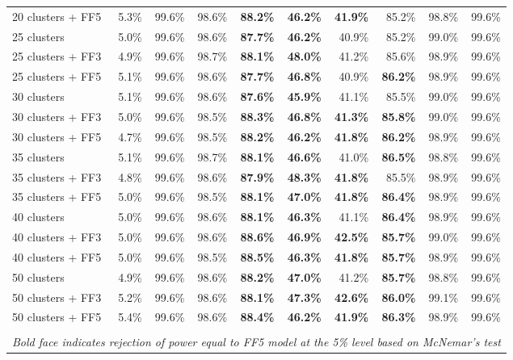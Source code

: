 \begin{table}[!h]
\begin{center}
\begin{tabular}{lrrrrrrrrr}
20 clusters + FF5	& 5.3\% & 99.6\% & 98.6\% & \textbf{88.2\%} & \textbf{46.2\%} & \textbf{41.9\%} & 85.2\% & 98.8\% & 99.6\% \\
25 clusters	& 5.0\% & 99.6\% & 98.6\% & \textbf{87.7\%} & \textbf{46.2\%} & 40.9\% & 85.2\% & 99.0\% & 99.6\% \\
25 clusters + FF3	& 4.9\% & 99.6\% & 98.7\% & \textbf{88.1\%} & \textbf{48.0\%} & 41.2\% & 85.6\% & 98.9\% & 99.6\% \\
25 clusters + FF5	& 5.1\% & 99.6\% & 98.6\% & \textbf{87.7\%} & \textbf{46.8\%} & 40.9\% & \textbf{86.2\%} & 98.9\% & 99.6\% \\
30 clusters	& 5.1\% & 99.6\% & 98.6\% & \textbf{87.6\%} & \textbf{45.9\%} & 41.1\% & 85.5\% & 99.0\% & 99.6\% \\
30 clusters + FF3	& 5.0\% & 99.6\% & 98.5\% & \textbf{88.3\%} & \textbf{46.8\%} & \textbf{41.3\%} & \textbf{85.8\%} & 99.0\% & 99.6\% \\
30 clusters + FF5	& 4.7\% & 99.6\% & 98.5\% & \textbf{88.2\%} & \textbf{46.2\%} & \textbf{41.8\%} & \textbf{86.2\%} & 98.9\% & 99.6\% \\
35 clusters	& 5.1\% & 99.6\% & 98.7\% & \textbf{88.1\%} & \textbf{46.6\%} & 41.0\% & \textbf{86.5\%} & 98.8\% & 99.6\% \\
35 clusters + FF3	& 4.8\% & 99.6\% & 98.6\% & \textbf{87.9\%} & \textbf{48.3\%} & \textbf{41.8\%} & 85.5\% & 98.9\% & 99.6\% \\
35 clusters + FF5	& 5.0\% & 99.6\% & 98.5\% & \textbf{88.1\%} & \textbf{47.0\%} & \textbf{41.8\%} & \textbf{86.4\%} & 98.9\% & 99.6\% \\
40 clusters	& 5.0\% & 99.6\% & 98.6\% & \textbf{88.1\%} & \textbf{46.3\%} & 41.1\% & \textbf{86.4\%} & 98.9\% & 99.6\% \\
40 clusters + FF3	& 5.0\% & 99.6\% & 98.6\% & \textbf{88.6\%} & \textbf{46.9\%} & \textbf{42.5\%} & \textbf{85.7\%} & 99.0\% & 99.6\% \\
40 clusters + FF5	& 5.0\% & 99.6\% & 98.5\% & \textbf{88.5\%} & \textbf{46.3\%} & \textbf{41.8\%} & \textbf{85.7\%} & 98.9\% & 99.6\% \\
50 clusters	& 4.9\% & 99.6\% & 98.6\% & \textbf{88.2\%} & \textbf{47.0\%} & 41.2\% & \textbf{85.7\%} & 98.8\% & 99.6\% \\
50 clusters + FF3	& 5.2\% & 99.6\% & 98.6\% & \textbf{88.1\%} & \textbf{47.3\%} & \textbf{42.6\%} & \textbf{86.0\%} & 99.1\% & 99.6\% \\
50 clusters + FF5	& 5.4\% & 99.6\% & 98.6\% & \textbf{88.4\%} & \textbf{46.2\%} & \textbf{41.9\%} & \textbf{86.3\%} & 98.9\% & 99.6\% \\
\hline\\
\multicolumn{10}{l}{\itshape Bold face indicates rejection of power equal to FF5 model at the 5\% level based on McNemar's test}
    \end{tabular}
    \end{center}
\end{table}
